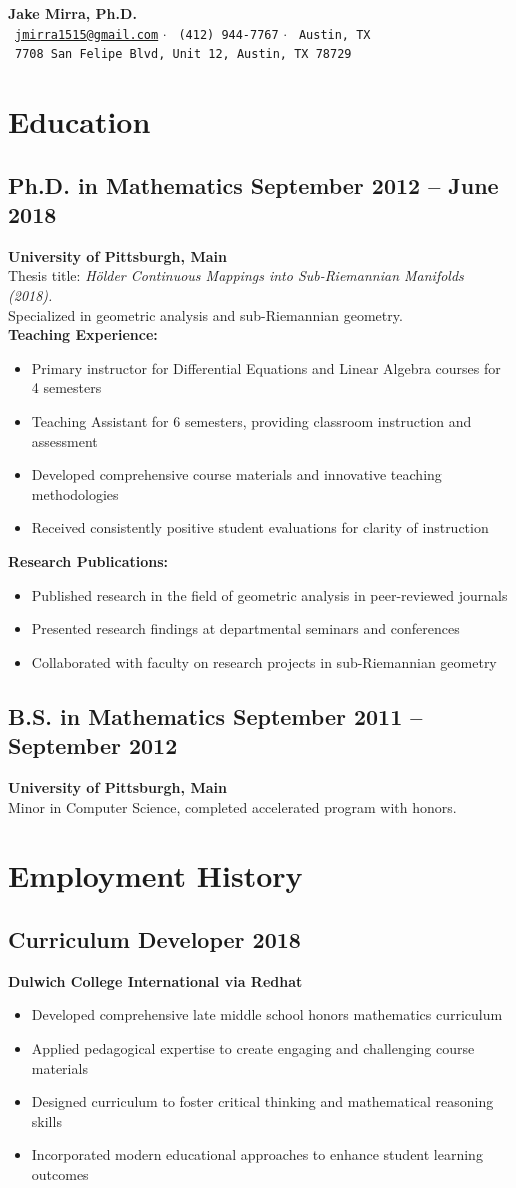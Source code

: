 \documentclass[11pt]{article}
\makeatletter
\newcommand{\cventry}[3]{
  \subsection[#1]{#1 \hfill #2}
  #3
}
\newcommand{\cvheader}{
  \begin{center}
    {\Huge\bfseries Jake Mirra, Ph.D.}\\[0.5em]
    \faEnvelope\ \href{mailto:jmirra1515@gmail.com}{\texttt{jmirra1515@gmail.com}} $\cdot$
    \faPhone\ \texttt{(412) 944-7767} $\cdot$
    \faMapMarker\ \texttt{Austin, TX}\\
    \faHome\ \texttt{7708 San Felipe Blvd, Unit 12, Austin, TX 78729}
  \end{center}
}
\makeatother
\begin{document}
\cvheader

\section{Education}
\cventry{Ph.D. in Mathematics}{September 2012 -- June 2018}{
  \textbf{University of Pittsburgh, Main}\\
  Thesis title: \emph{Hölder Continuous Mappings into Sub-Riemannian Manifolds (2018).}\\
  Specialized in geometric analysis and sub-Riemannian geometry.\\
  \textbf{Teaching Experience:}
  \begin{itemize}[leftmargin=*]
    \item Primary instructor for Differential Equations and Linear Algebra courses for 4 semesters
    \item Teaching Assistant for 6 semesters, providing classroom instruction and assessment
    \item Developed comprehensive course materials and innovative teaching methodologies
    \item Received consistently positive student evaluations for clarity of instruction
  \end{itemize}
  \textbf{Research Publications:}
  \begin{itemize}[leftmargin=*]
    \item Published research in the field of geometric analysis in peer-reviewed journals
    \item Presented research findings at departmental seminars and conferences
    \item Collaborated with faculty on research projects in sub-Riemannian geometry
  \end{itemize}
}

\cventry{B.S. in Mathematics}{September 2011 -- September 2012}{
  \textbf{University of Pittsburgh, Main}\\
  Minor in Computer Science, completed accelerated program with honors.
}

\section{Employment History}
\cventry{Curriculum Developer}{2018}{
  \textbf{Dulwich College International via Redhat}
  \begin{itemize}[leftmargin=*]
    \item Developed comprehensive late middle school honors mathematics curriculum
    \item Applied pedagogical expertise to create engaging and challenging course materials
    \item Designed curriculum to foster critical thinking and mathematical reasoning skills
    \item Incorporated modern educational approaches to enhance student learning outcomes
  \end{itemize}
}
\end{document}
